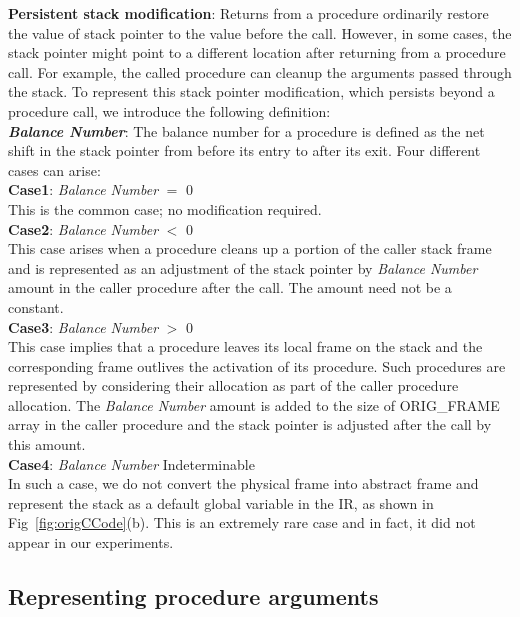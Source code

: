 
\textbf{Persistent stack modification}: Returns from a procedure ordinarily restore the value of stack pointer to the value before the call. However, in some cases, the stack pointer might point to a different location after returning from a procedure call. For example, the called procedure can cleanup the arguments passed through the stack. To represent this stack pointer modification, which persists beyond a procedure call, we introduce the following definition:\\
\textbf{\emph{Balance Number}}: The balance number for a procedure is defined as the net shift in the stack pointer from before its entry to after its exit. Four different cases can arise:\\
\textbf{Case1}: {\emph{Balance Number} $=$ 0}\\
This is the common case; no modification required.\\
\textbf{Case2}: {\emph{Balance Number} $<$ 0}\\
This case arises when a procedure cleans up a portion of the caller stack frame and is represented as an adjustment of the stack pointer by \emph{Balance Number} amount in the caller procedure after the call. The amount need not be a constant.\\
\textbf{Case3}: {{\emph{Balance Number} $>$ 0}}\\
This case implies that a procedure leaves its local frame on the stack and the corresponding frame outlives the activation of its procedure. Such procedures are represented by considering their allocation as part of the caller procedure allocation. The \emph{Balance Number} amount is added to the size of ORIG\_FRAME array in the caller procedure and the stack pointer is adjusted after the call by this amount. \\
\textbf{Case4}: \emph{Balance Number} Indeterminable\\
In such a case, we do not convert the physical frame into abstract frame and represent the stack as a default global variable in the IR, as shown in Fig~\ref{fig:origCCode}(b). This is an extremely rare case and in fact, it did not appear in our experiments.

\subsection{Representing procedure arguments} 
\label{sec:procarg}

